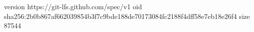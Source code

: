 version https://git-lfs.github.com/spec/v1
oid sha256:2b0b867af662039854b3f7c9bde188de70173084fc2188f4dff58e7eb18e26f4
size 87544
